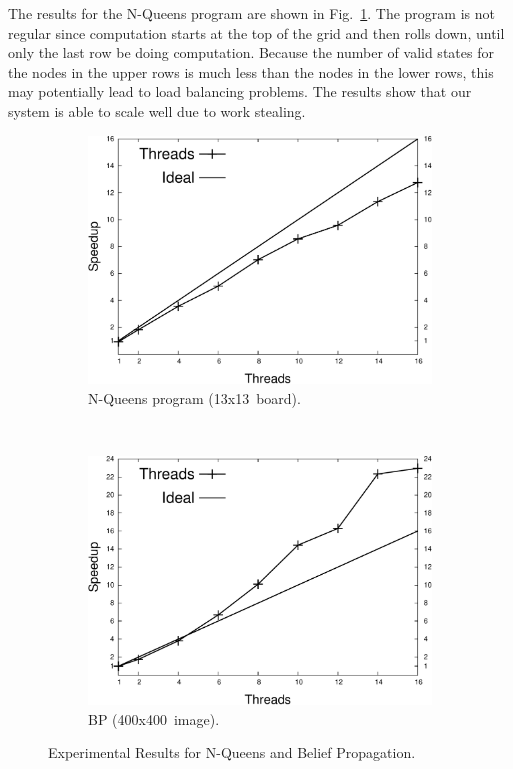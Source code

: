 The results for the N-Queens program are shown in Fig.~\ref{exp:8queens}. The program is not regular since computation starts at the top of the grid and then rolls down, until only the last row be doing computation. Because the number of valid states for the nodes in the upper rows is much less than the nodes in the lower rows, this may potentially lead to
load balancing problems. The results show that our system is able to scale well due to work stealing.

\begin{figure}[ht]
   \centering
   \begin{subfigure}[b]{\plotsize}
      \includegraphics[width=\textwidth]{speedup_8queens-13.pdf}
      \caption{N-Queens program (13x13~board).}
      \label{exp:8queens}
   \end{subfigure}
   ~~
   \begin{subfigure}[b]{\plotsize}
      \includegraphics[width=\textwidth]{speedup_bp-400.pdf}
      \caption{BP (400x400~image).}
      \label{exp:bp}
   \end{subfigure}
   \caption{Experimental Results for N-Queens and Belief Propagation.}
\end{figure}

